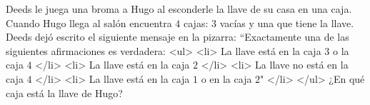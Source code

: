 Deeds le juega una broma a Hugo al esconderle la llave de su casa en una caja. Cuando Hugo llega al salón encuentra $4$ cajas: $3$ vacías y una que tiene la llave. Deeds dejó escrito el siguiente mensaje en la pizarra: “Exactamente una de las siguientes afirmaciones es verdadera:
<ul>
<li> La llave está en la caja $3$ o la caja $4$ </li>
<li> La llave está en la caja $2$ </li>
<li> La llave no está en la caja $4$ </li>
<li> La llave está en la caja $1$ o en la caja $2$" </li>
</ul>
¿En qué caja está la llave de Hugo?